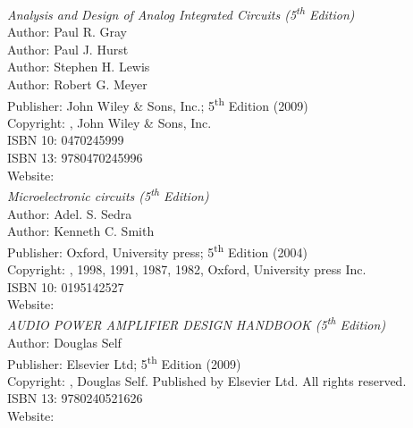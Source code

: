 
\begin{thebibliography}{9}




\emph{Analysis and Design of Analog Integrated Circuits (5\textsuperscript{th} Edition)}\\
Author: Paul R. Gray\\
Author: Paul J. Hurst\\
Author: Stephen H. Lewis\\
Author: Robert G. Meyer\\
Publisher: John Wiley \& Sons, Inc.; 5\textsuperscript{th} Edition (2009)\\
Copyright: \textcopyright {}, John Wiley \& Sons, Inc.\\
ISBN 10: 0470245999\\
ISBN 13: 9780470245996\\
Website: \\




\emph{Microelectronic circuits (5\textsuperscript{th} Edition)}\\
Author: Adel. S. Sedra\\
Author: Kenneth C. Smith\\
Publisher: Oxford, University press; 5\textsuperscript{th} Edition (2004)\\
Copyright: \textcopyright {}, 1998, 1991, 1987, 1982, Oxford, University press Inc.\\
ISBN 10: 0195142527\\
Website: \\


\emph{AUDIO POWER AMPLIFIER DESIGN HANDBOOK (5\textsuperscript{th} Edition)}\\
Author: Douglas Self\\
Publisher: Elsevier Ltd; 5\textsuperscript{th} Edition (2009)\\
Copyright: \textcopyright {}, Douglas Self. Published by Elsevier Ltd. All rights reserved.\\
ISBN 13: 9780240521626\\
Website: \\


\end{thebibliography}